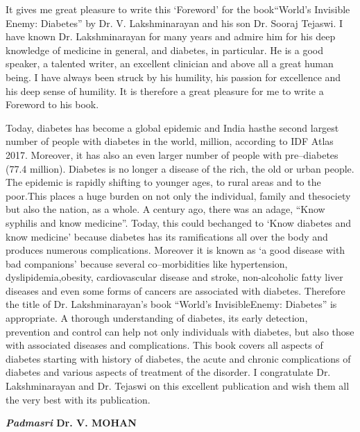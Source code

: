It gives me great pleasure to write this ‘Foreword’ for the book\break “World's Invisible Enemy: Diabetes” by Dr. V. Lakshminara\-yan and his son Dr. Sooraj Tejaswi. I have known Dr. Lakshminarayan for many years and admire him for his deep knowledge of medicine in general, and diabetes, in particular. He is a good speaker, a talented writer, an excellent clinician and above all a great human being. I have always been struck by his humi\-lity, his passion for excellence and his deep sense of humility. It is therefore a great pleasure for me to write a Foreword to his book.

Today, diabetes has become a global epidemic and India has\break the second largest number of people with diabetes in the world, million, according to IDF Atlas 2017. Moreover, it has also an even larger number of people with pre–diabetes (77.4 million). Diabetes is no longer a disease of the rich, the old or urban people. The epidemic is rapidly shifting to younger ages, to rural areas and to the poor.\break This places a huge burden on not only the individual, family and the\break society but also the nation, as a whole. A century ago, there was an adage, “Know syphilis and know medicine”. Today, this could be\break changed to ‘Know diabetes and know medicine’ because diabetes has its ramifications all over the body and produces numerous complications. Moreover it is known as ‘a good di\-sease with bad companions’ because seve\-ral co–morbidities like hypertension, dyslipidemia,\break obesity, cardiovascular disease and stroke, non-alcoholic fatty liver diseases and even some forms of cancers are associated with diabetes. Therefore the title of Dr. Lakshminarayan’s book “World's Invisible\break Enemy: Diabetes” is appropriate. A thorough understanding of diabetes, its early detection, prevention and control can help not only individuals with diabetes, but also those with associated diseases and compli\-cations. This book covers all aspects of diabetes starting with history of diabetes, the acute and chronic complications of diabetes and various aspects of treatment of the disorder. I congra\-tulate Dr. Lakshminarayan and Dr. Tejaswi on this exce\-llent publication and wish them all the very best with its publication.

\begin{flushright}
\textbf{\textit{Padmasri} Dr. V. MOHAN}
\end{flushright}

